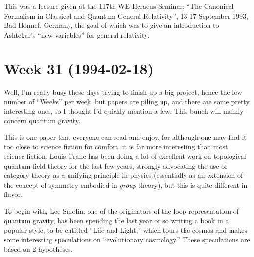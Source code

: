 \documentclass{article}
\def\tightlist{}
\renewcommand{\texttt}[1]{%
  \begingroup
  \ttfamily
  \begingroup\lccode`~=`/\lowercase{\endgroup\def~}{/\discretionary{}{}{}}%
  \begingroup\lccode`~=`[\lowercase{\endgroup\def~}{[\discretionary{}{}{}}%
  \begingroup\lccode`~=`.\lowercase{\endgroup\def~}{.\discretionary{}{}{}}%
  \catcode`/=\active\catcode`[=\active\catcode`.=\active
  \scantokens{#1\noexpand}%
  \endgroup
}
\begin{document}
This was a lecture given at the 117th WE-Heraeus Seminar: ``The
Canonical Formalism in Classical and Quantum General Relativity'', 13-17
September 1993, Bad-Honnef, Germany, the goal of which was to give an
introduction to Ashtekar's ``new variables'' for general relativity.
\hypertarget{week-31-1994-02-18}{%
\section{Week 31 (1994-02-18)}\label{week-31-1994-02-18}}

Well, I'm really busy these days trying to finish up a big project,
hence the low number of ``Weeks'' per week, but papers are piling up,
and there are some pretty interesting ones, so I thought I'd quickly
mention a few. This bunch will mainly concern quantum gravity.


This is one paper that everyone can read and enjoy, for although one may
find it too close to science fiction for comfort, it is far more
interesting than most science fiction. Louis Crane has been doing a lot
of excellent work on topological quantum field theory for the last few
years, strongly advocating the use of category theory as a unifying
principle in physics (essentially as an extension of the concept of
symmetry embodied in \emph{group} theory), but this is quite different
in flavor.

To begin with, Lee Smolin, one of the originators of the loop
representation of quantum gravity, has been spending the last year or so
writing a book in a popular style, to be entitled ``Life and Light,''
which tours the cosmos and makes some interesting speculations on
``evolutionary cosmology.'' These speculations are based on 2
hypotheses.
\end{document}
